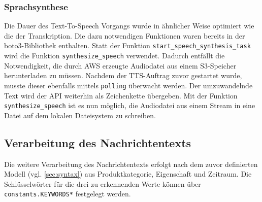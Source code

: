 \subsubsection{Sprachsynthese}

Die Dauer des Text-To-Speech Vorgangs wurde in ähnlicher Weise optimiert wie die der Transkription. Die dazu notwendigen Funktionen waren bereits in der boto3-Bibliothek enthalten. Statt der Funktion \lstinline{start_speech_synthesis_task} wird die Funktion \lstinline{synthesize_speech} verwendet. Dadurch entfällt die Notwendigkeit, die durch AWS erzeugte Audiodatei aus einem S3-Speicher herunterladen zu müssen. Nachdem der TTS-Auftrag zuvor gestartet wurde, musste dieser ebenfalls mittels \lstinline{polling} überwacht werden. Der umzuwandelnde Text wird der API weiterhin als Zeichenkette übergeben. Mit der Funktion \lstinline{synthesize_speech} ist es nun möglich, die Audiodatei aus einem Stream in eine Datei auf dem lokalen Dateisystem zu schreiben. 

\subsection{Verarbeitung des Nachrichtentexts}

Die weitere Verarbeitung des Nachrichtentexts erfolgt nach dem zuvor definierten Modell (vgl. \autoref{sec:syntax}) aus Produktkategorie, Eigenschaft und Zeitraum. Die Schlüsselwörter für die drei zu erkennenden Werte können über \lstinline{constants.KEYWORDS*} festgelegt werden.
